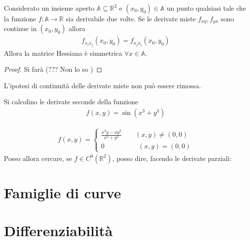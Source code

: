 \documentclass[a4paper, oneside]{book}
\begin{document}
\begin{theorem}
    Considerato un insieme aperto $\mathbb{A} \subseteq \mathbb{R}^{2} $ e $(x_0, y_0) \in \mathbb{A}$ un 
    punto qualsiasi tale che la funzione $f: \mathbb{A} \to \mathbb{R}$ sia
    derivabile due volte. Se le derivate miste
    $f_{xy}, f_{yx}$ sono continue in $(x_0, y_0)$ allora 
    \begin{align}
        f_{x_i x_j}(x_0, y_0) = f_{x_j x_i}(x_0, y_0) 
    \end{align}
    Allora la matrice Hessiana
    è simmetrica $\forall x \in \mathbb{A}$. 
\end{theorem}
\begin{proof}
    Si farà (??? Non lo so )
\end{proof}
\begin{observation}
    L'ipotesi di continuità delle derivate miste non può essere rimossa. 
\end{observation}

\begin{example}
    Si calcolino le derivate seconde della funzione
    \begin{gather*}
        f(x, y) = \sin(x^{3} + y^{3}  )
    \end{gather*}
\end{example}

\begin{example}[da rivedere]
    \begin{gather*}
        f(x, y) = \left\{\begin{array}{l}
            \frac{x^{3}y - xy^{3}  }{x^{2} + y^{2}  } \qquad (x, y) \neq (0, 0) \\
            0 \qquad \qquad\quad (x, y) = (0, 0)
        \end{array}\right.
    \end{gather*}
    Posso allora cercare, se $f \in C^{0}( \mathbb{R }^{2} )$, posso dire, facendo le derivate
    parziali:
\end{example}

\section{Famiglie di curve}



\section{Differenziabilità}
\end{document}

